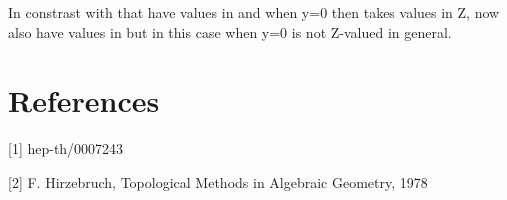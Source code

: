 \documentclass[a4paper,a4paper]{article}
\begin{document}
In constrast with \coordHE{} that have values in  \coordHE{} and when y=0 then takes values in Z, now \coordHE{} also have values in  \coordHE{} but in this case when y=0 \coordHE{} is not Z-valued in general.
























 





 


\section{References}

\setlength{\baselineskip}{20pt}
[1]   hep-th/0007243

[2]   F. Hirzebruch, Topological Methods in Algebraic Geometry, 1978







\setlength{\baselineskip}{50pt}   
\end{document}
